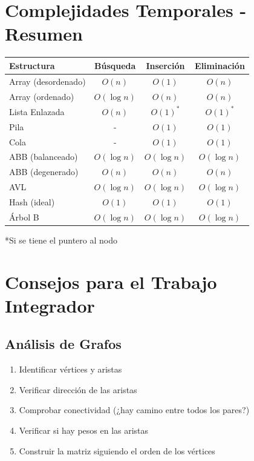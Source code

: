 \documentclass[12pt,a4paper]{article}
\begin{document}
\newpage

\section{Complejidades Temporales - Resumen}

\begin{center}
\begin{tabular}{|l|c|c|c|}
\hline
\textbf{Estructura} & \textbf{Búsqueda} & \textbf{Inserción} & \textbf{Eliminación} \\
\hline
Array (desordenado) & $O(n)$ & $O(1)$ & $O(n)$ \\
Array (ordenado) & $O(\log n)$ & $O(n)$ & $O(n)$ \\
Lista Enlazada & $O(n)$ & $O(1)^*$ & $O(1)^*$ \\
Pila & - & $O(1)$ & $O(1)$ \\
Cola & - & $O(1)$ & $O(1)$ \\
ABB (balanceado) & $O(\log n)$ & $O(\log n)$ & $O(\log n)$ \\
ABB (degenerado) & $O(n)$ & $O(n)$ & $O(n)$ \\
AVL & $O(\log n)$ & $O(\log n)$ & $O(\log n)$ \\
Hash (ideal) & $O(1)$ & $O(1)$ & $O(1)$ \\
Árbol B & $O(\log n)$ & $O(\log n)$ & $O(\log n)$ \\
\hline
\end{tabular}
\end{center}

\small{*Si se tiene el puntero al nodo}

\section{Consejos para el Trabajo Integrador}

\subsection{Análisis de Grafos}
\begin{enumerate}
    \item Identificar vértices y aristas
    \item Verificar dirección de las aristas
    \item Comprobar conectividad (¿hay camino entre todos los pares?)
    \item Verificar si hay pesos en las aristas
    \item Construir la matriz siguiendo el orden de los vértices
\end{enumerate}
\end{document}
